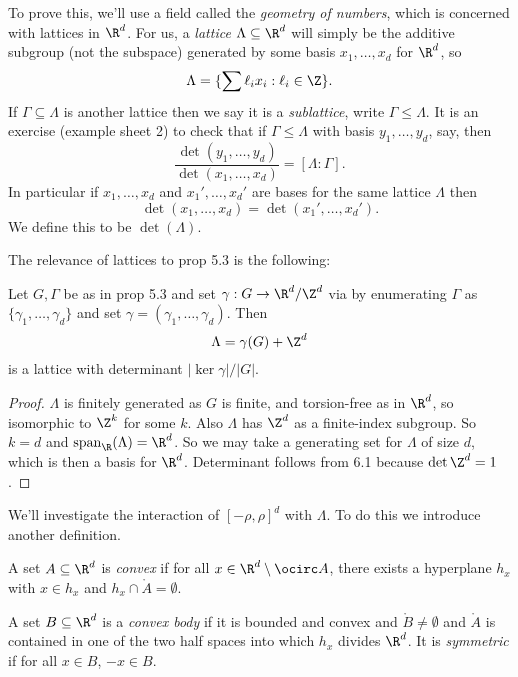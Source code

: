 \documentclass[a4paper]{article}
\begin{document}
To prove this, we'll use a field called the \emph{geometry of numbers}, which is concerned with lattices in \(\R^d\). For us, a \emph{lattice} \(\Lambda \subseteq \R^d\) will simply be the additive subgroup (not the subspace) generated by some basis \(x_1, \dots, x_d\) for \(\R^d\), so
\[
  \Lambda = \{\sum \ell_i x_i: \ell_i \in \Z\}.
\]
If \(\Gamma \subseteq \Lambda\) is another lattice then we say it is a \emph{sublattice}, write \(\Gamma \leq \Lambda\). It is an exercise (example sheet 2) to check that if \(\Gamma \leq \Lambda\) with basis \(y_1, \dots, y_d\), say, then
\[
  \frac{\det (y_1, \dots, y_d)}{\det (x_1, \dots, x_d)} = [\Lambda:\Gamma].
\]
In particular if \(x_1, \dots, x_d\) and \(x_1', \dots, x_d'\) are bases for the same lattice \(\Lambda\) then
\[
  \det (x_1, \dots, x_d) = \det (x_1', \dots, x_d').
\]
We define this to be \(\det (\Lambda)\).

The relevance of lattices to prop 5.3 is the following:

\begin{lemma}[lemma 6.1]
  Let \(G, \Gamma\) be as in prop 5.3 and set \(\gamma: G \to \R^d/\Z^d\) via by enumerating \(\Gamma\) as \(\{\gamma_1, \dots, \gamma_d\}\) and set \(\gamma = (\gamma_1, \dots, \gamma_d)\). Then
  \[
    \Lambda = \gamma(G) + \Z^d
  \]
  is a lattice with determinant \(|\ker \gamma|/|G|\).
\end{lemma}

\begin{proof}
  \(\Lambda\) is finitely generated as \(G\) is finite, and torsion-free as in \(\R^d\), so isomorphic to \(\Z^k\) for some \(k\). Also \(\Lambda\) has \(\Z^d\) as a finite-index subgroup. So \(k = d\) and \(\text{span}_\R(\Lambda) = \R^d\). So we may take a generating set for \(\Lambda\) of size \(d\), which is then a basis for \(\R^d\). Determinant follows from 6.1 because \(\det \Z^d = 1\).
\end{proof}
  
We'll investigate the interaction of \([-\rho, \rho]^d\) with \(\Lambda\). To do this we introduce another definition.

\begin{definition}[convexity]
  A set \(A \subseteq \R^d\) is \emph{convex} if for all \(x \in \R^d \setminus \ocirc A\), there exists a hyperplane \(h_x\) with \(x \in h_x\) and \(h_x \cap \ocirc A = \emptyset\).
\end{definition}

\begin{definition}
  A set \(B \subseteq \R^d\) is a \emph{convex body} if it is bounded and convex and \(\ocirc B \neq \emptyset\) and \(\ocirc A\) is contained in one of the two half spaces into which \(h_x\) divides \(\R^d\). It is \emph{symmetric} if for all \(x \in B\), \(-x \in B\).
\end{definition}
\end{document}
